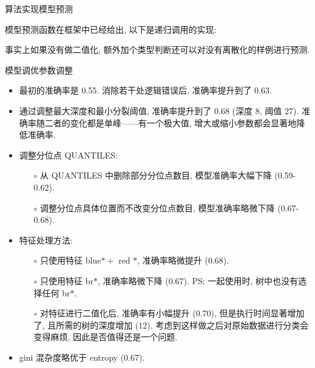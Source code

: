 \begin{frame}{算法实现}{模型预测}

\vspace{-0.2cm}

模型预测函数在框架中已经给出, 以下是递归调用的实现:

\vspace{-0.1cm}

\begin{figure}[bth]
\end{figure}

\vspace{-0.1cm}

\noindent 事实上如果没有做二值化, 额外加个类型判断还可以对没有离散化的样例进行预测.
\end{frame}

\begin{frame}{模型调优}{参数调整}

\vspace{-0.2cm}

\begin{itemize}
\item 最初的准确率是 0.55. 消除若干处逻辑错误后, 准确率提升到了 0.63.
\item 通过调整最大深度和最小分裂阈值, 准确率提升到了 0.68 (深度 8, 阈值 27). 准确率随二者的变化都是单峰——有一个极大值, 增大或缩小参数都会显著地降低准确率.
\item 调整分位点 QUANTILES:
\begin{itemize}\setlength{\itemindent}{-1em}
\item[$\circ$] 从 QUANTILES 中删除部分分位点数目, 模型准确率大幅下降 (0.59-0.62).
\item[$\circ$] 调整分位点具体位置而不改变分位点数目, 模型准确率略微下降 (0.67-0.68).
\end{itemize}
\item 特征处理方法:
\begin{itemize}\setlength{\itemindent}{-1em}
\item[$\circ$] 只使用特征 blue$* +$ red $*$, 准确率略微提升 (0.68).
\item[$\circ$] 只使用特征 br$*$, 准确率略微下降 (0.67). PS: 一起使用时, 树中也没有选择任何 br$*$.
\item[$\circ$] 对特征进行二值化后, 准确率有小幅提升 (0.70), 但是执行时间显著增加了, 且所需的树的深度增加 (12). 考虑到这样做之后对原始数据进行分类会变得麻烦, 因此是否值得还是一个问题.
\end{itemize}
\item gini 混杂度略优于 entropy (0.67).
\end{itemize}
\end{frame}

